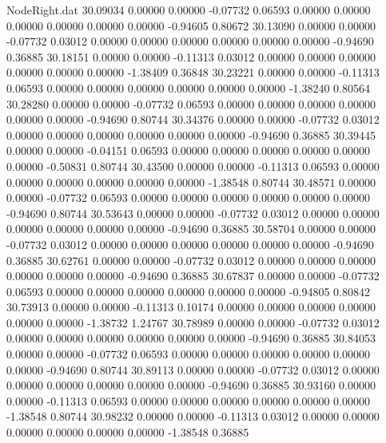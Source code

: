 \begin{filecontents}{NodeRight.dat}
  30.09034    0.00000    0.00000    -0.07732    0.06593    0.00000    0.00000    0.00000    0.00000    0.00000    0.00000   -0.94605    0.80672
  30.13090    0.00000    0.00000    -0.07732    0.03012    0.00000    0.00000    0.00000    0.00000    0.00000    0.00000   -0.94690    0.36885
  30.18151    0.00000    0.00000    -0.11313    0.03012    0.00000    0.00000    0.00000    0.00000    0.00000    0.00000   -1.38409    0.36848
  30.23221    0.00000    0.00000    -0.11313    0.06593    0.00000    0.00000    0.00000    0.00000    0.00000    0.00000   -1.38240    0.80564
  30.28280    0.00000    0.00000    -0.07732    0.06593    0.00000    0.00000    0.00000    0.00000    0.00000    0.00000   -0.94690    0.80744
  30.34376    0.00000    0.00000    -0.07732    0.03012    0.00000    0.00000    0.00000    0.00000    0.00000    0.00000   -0.94690    0.36885
  30.39445    0.00000    0.00000    -0.04151    0.06593    0.00000    0.00000    0.00000    0.00000    0.00000    0.00000   -0.50831    0.80744
  30.43500    0.00000    0.00000    -0.11313    0.06593    0.00000    0.00000    0.00000    0.00000    0.00000    0.00000   -1.38548    0.80744
  30.48571    0.00000    0.00000    -0.07732    0.06593    0.00000    0.00000    0.00000    0.00000    0.00000    0.00000   -0.94690    0.80744
  30.53643    0.00000    0.00000    -0.07732    0.03012    0.00000    0.00000    0.00000    0.00000    0.00000    0.00000   -0.94690    0.36885
  30.58704    0.00000    0.00000    -0.07732    0.03012    0.00000    0.00000    0.00000    0.00000    0.00000    0.00000   -0.94690    0.36885
  30.62761    0.00000    0.00000    -0.07732    0.03012    0.00000    0.00000    0.00000    0.00000    0.00000    0.00000   -0.94690    0.36885
  30.67837    0.00000    0.00000    -0.07732    0.06593    0.00000    0.00000    0.00000    0.00000    0.00000    0.00000   -0.94805    0.80842
  30.73913    0.00000    0.00000    -0.11313    0.10174    0.00000    0.00000    0.00000    0.00000    0.00000    0.00000   -1.38732    1.24767
  30.78989    0.00000    0.00000    -0.07732    0.03012    0.00000    0.00000    0.00000    0.00000    0.00000    0.00000   -0.94690    0.36885
  30.84053    0.00000    0.00000    -0.07732    0.06593    0.00000    0.00000    0.00000    0.00000    0.00000    0.00000   -0.94690    0.80744
  30.89113    0.00000    0.00000    -0.07732    0.03012    0.00000    0.00000    0.00000    0.00000    0.00000    0.00000   -0.94690    0.36885
  30.93160    0.00000    0.00000    -0.11313    0.06593    0.00000    0.00000    0.00000    0.00000    0.00000    0.00000   -1.38548    0.80744
  30.98232    0.00000    0.00000    -0.11313    0.03012    0.00000    0.00000    0.00000    0.00000    0.00000    0.00000   -1.38548    0.36885

\end{filecontents}
